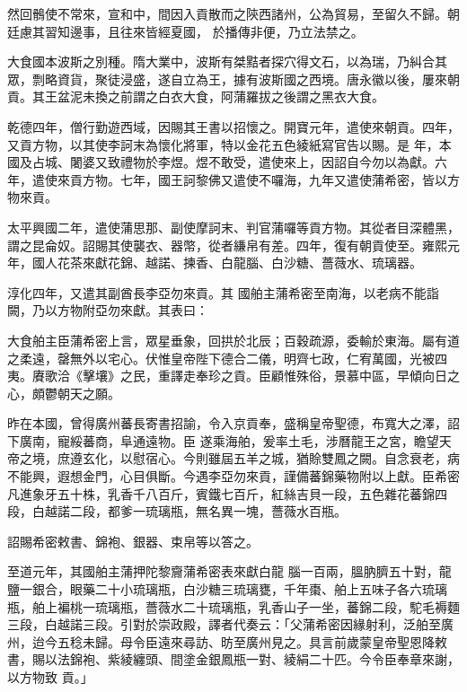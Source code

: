 \begin{pinyinscope}
 然回鶻使不常來，宣和中，間因入貢散而之陝西諸州，公為貿易，至留久不歸。朝廷慮其習知邊事，且往來皆經夏國，
 於播傳非便，乃立法禁之。



 大食國本波斯之別種。隋大業中，波斯有桀黠者探穴得文石，以為瑞，乃糾合其眾，剽略資貨，聚徒浸盛，遂自立為王，據有波斯國之西境。唐永徽以後，屢來朝貢。其王盆泥未換之前謂之白衣大食，阿蒲羅拔之後謂之黑衣大食。



 乾德四年，僧行勤遊西域，因賜其王書以招懷之。開寶元年，遣使來朝貢。四年，又貢方物，以其使李訶末為懷化將軍，特以金花五色綾紙寫官告以賜。是
 年，本國及占城、闍婆又致禮物於李煜。煜不敢受，遣使來上，因詔自今勿以為獻。六年，遣使來貢方物。七年，國王訶黎佛又遣使不囉海，九年又遣使蒲希密，皆以方物來貢。



 太平興國二年，遣使蒲思那、副使摩訶末、判官蒲囉等貢方物。其從者目深體黑，謂之昆侖奴。詔賜其使襲衣、器幣，從者縑帛有差。四年，復有朝貢使至。雍熙元年，國人花茶來獻花錦、越諾、揀香、白龍腦、白沙糖、薔薇水、琉璃器。



 淳化四年，又遣其副酋長李亞勿來貢。其
 國舶主蒲希密至南海，以老病不能詣闕，乃以方物附亞勿來獻。其表曰：



 大食舶主臣蒲希密上言，眾星垂象，回拱於北辰；百穀疏源，委輸於東海。屬有道之柔遠，罄無外以宅心。伏惟皇帝陛下德合二儀，明齊七政，仁宥萬國，光被四夷。賡歌洽《擊壤》之民，重譯走奉珍之貢。臣顧惟殊俗，景慕中區，早傾向日之心，頗鬱朝天之願。



 昨在本國，曾得廣州蕃長寄書招諭，令入京貢奉，盛稱皇帝聖德，布寬大之澤，詔下廣南，寵綏蕃商，阜通遠物。臣
 遂乘海舶，爰率土毛，涉曆龍王之宮，瞻望天帝之境，庶遵玄化，以慰宿心。今則雖屆五羊之城，猶賒雙鳳之闕。自念衰老，病不能興，遐想金門，心目俱斷。今遇李亞勿來貢，謹備蕃錦藥物附以上獻。臣希密凡進象牙五十株，乳香千八百斤，賓鐵七百斤，紅絲吉貝一段，五色雜花蕃錦四段，白越諾二段，都爹一琉璃瓶，無名異一塊，薔薇水百瓶。



 詔賜希密敕書、錦袍、銀器、束帛等以答之。



 至道元年，其國舶主蒲押陀黎齎蒲希密表來獻白龍
 腦一百兩，膃肭臍五十對，龍鹽一銀合，眼藥二十小琉璃瓶，白沙糖三琉璃甕，千年棗、舶上五味子各六琉璃瓶，舶上褊桃一琉璃瓶，薔薇水二十琉璃瓶，乳香山子一坐，蕃錦二段，駝毛褥麵三段，白越諾三段。引對於崇政殿，譯者代奏云：「父蒲希密因緣射利，泛舶至廣州，迨今五稔未歸。母令臣遠來尋訪、昉至廣州見之。具言前歲蒙皇帝聖恩降敕書，賜以法錦袍、紫綾纏頭、間塗金銀鳳瓶一對、綾絹二十匹。今令臣奉章來謝，以方物致
 貢。」




\end{pinyinscope}
